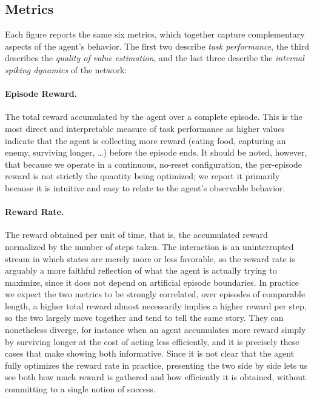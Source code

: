 \subsection{Metrics}
Each figure reports the same six metrics, which together capture complementary aspects of the 
agent's behavior. The first two describe \emph{task performance}, the third describes the 
\emph{quality of value estimation}, and the last three describe the \emph{internal spiking 
dynamics} of the network:

\paragraph{Episode Reward.} The total reward accumulated by the agent over a complete 
episode. This is the most direct and interpretable measure of task performance as higher values 
indicate that the agent is collecting more reward (eating food, capturing an enemy, 
surviving longer, \ldots) before the episode ends. It should be noted, however, that because we operate 
in a continuous, no-reset configuration, the per-episode reward is not strictly the quantity 
being optimized; we report it primarily because it is intuitive and easy to relate to the 
agent's observable behavior.
    
\paragraph{Reward Rate.} The reward obtained per unit of time, that is, the accumulated reward 
normalized by the number of steps taken. The 
interaction is an uninterrupted stream in which states are merely more or less favorable, so the reward rate is arguably a more faithful reflection of what the agent is 
actually trying to maximize, since it does not depend on artificial episode boundaries. In 
practice we expect the two metrics to be strongly correlated, over episodes of comparable length, 
a higher total reward almost necessarily implies a higher reward per step, so the two largely move 
together and tend to tell the same story. They can nonetheless diverge, for instance when an 
agent accumulates more reward simply by surviving longer at the cost of acting less efficiently, and 
it is precisely these cases that make showing both informative. Since it is not clear that the 
agent fully optimizes the reward rate in practice, presenting the two side by side lets us see 
both how much reward is gathered and how efficiently it is obtained, without committing to a 
single notion of success.

